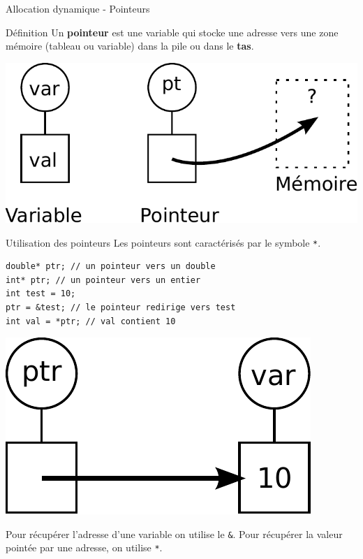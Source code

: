 \begin{frame}[fragile=singleslide]{Allocation dynamique - Pointeurs}
     \begin{block}{Définition}
        Un \textbf{pointeur} est une variable qui stocke une adresse vers une zone mémoire (tableau ou variable) dans la pile ou dans le \textbf{tas}.
    \end{block}
    \begin{center}
    \includegraphics[width=0.8\linewidth]{images/var_pointeur.pdf}
    \end{center}
\end{frame}

\begin{frame}[fragile=singleslide]{Utilisation des pointeurs}
    Les pointeurs sont caractérisés par le symbole \texttt{*}.
    \begin{verbatim}
double* ptr; // un pointeur vers un double
int* ptr; // un pointeur vers un entier
int test = 10;
ptr = &test; // le pointeur redirige vers test
int val = *ptr; // val contient 10
    \end{verbatim}
    \begin{center}
        \includegraphics[width=0.27\linewidth]{images/ptr.pdf}
    \end{center}
Pour récupérer l'adresse d'une variable on utilise le \texttt{\&}. Pour récupérer la valeur pointée par une adresse, on utilise \texttt{*}.
\end{frame}


